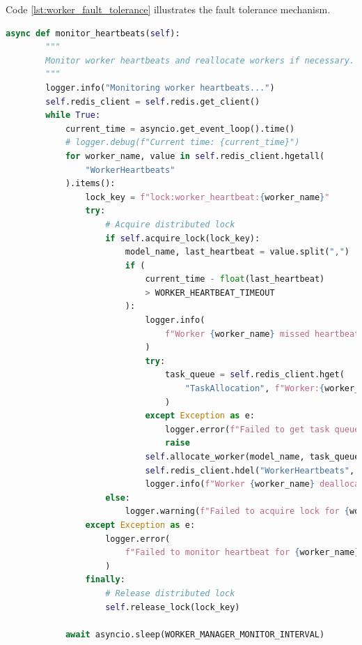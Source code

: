 Code \ref{lst:worker_fault_tolerance} illustrates the fault tolerance mechanism.

\begin{lstlisting}[language=python, caption={Worker Fault Tolerance Mechanism}, label={lst:worker_fault_tolerance}]
  async def monitor_heartbeats(self):
        """
        Monitor worker heartbeats and reallocate workers if necessary.
        """
        logger.info("Monitoring worker heartbeats...")
        self.redis_client = self.redis.get_client()
        while True:
            current_time = asyncio.get_event_loop().time()
            # logger.debug(f"Current time: {current_time}")
            for worker_name, value in self.redis_client.hgetall(
                "WorkerHeartbeats"
            ).items():
                lock_key = f"lock:worker_heartbeat:{worker_name}"
                try:
                    # Acquire distributed lock
                    if self.acquire_lock(lock_key):
                        model_name, last_heartbeat = value.split(",")
                        if (
                            current_time - float(last_heartbeat)
                            > WORKER_HEARTBEAT_TIMEOUT
                        ):
                            logger.info(
                                f"Worker {worker_name} missed heartbeat. Allocating new worker."
                            )
                            try:
                                task_queue = self.redis_client.hget(
                                    "TaskAllocation", f"Worker:{worker_name}"
                                )
                            except Exception as e:
                                logger.error(f"Failed to get task queue: {str(e)}")
                                raise
                            self.allocate_worker(model_name, task_queue)
                            self.redis_client.hdel("WorkerHeartbeats", worker_name)
                            logger.info(f"Worker {worker_name} deallocated.")
                    else:
                        logger.warning(f"Failed to acquire lock for {worker_name}")
                except Exception as e:
                    logger.error(
                        f"Failed to monitor heartbeat for {worker_name}: {str(e)}"
                    )
                finally:
                    # Release distributed lock
                    self.release_lock(lock_key)

            await asyncio.sleep(WORKER_MANAGER_MONITOR_INTERVAL)
\end{lstlisting}

